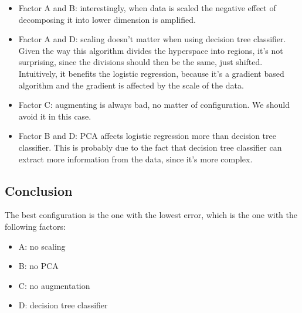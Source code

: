\documentclass{article}
\begin{document}
\begin{itemize}
    \item Factor A and B: interestingly, when data is scaled the negative effect of decomposing it into lower dimension is amplified.
    \item Factor A and D: scaling doesn't matter when using decision tree classifier. Given the way this algorithm divides the hyperspace into regions, it's not surprising, since the divisions should then be the same, just shifted. Intuitively, it benefits the logistic regression, because it's a gradient based algorithm and the gradient is affected by the scale of the data.
    \item Factor C: augmenting is always bad, no matter of configuration. We should avoid it in this case.
    \item Factor B and D: PCA affects logistic regression more than decision tree classifier. This is probably due to the fact that decision tree classifier can extract more information from the data, since it's more complex.
\end{itemize}

\subsection{Conclusion}

The best configuration is the one with the lowest error, which is the one with the following factors:

\begin{itemize}
    \item A: no scaling
    \item B: no PCA
    \item C: no augmentation
    \item D: decision tree classifier
\end{itemize}
\end{document}
